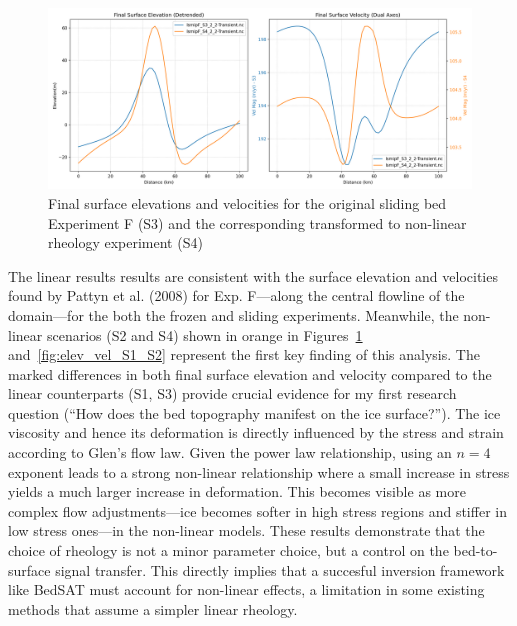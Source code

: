 \begin{figure}[H]
    \includegraphics[scale=0.40]{figures/combined_elevation_detrended_surface_velocity_['S3']_['S4'].png}
    \caption{Final surface elevations and velocities for the original sliding bed Experiment F (S3) and the corresponding transformed to non-linear rheology experiment (S4)}
    \label{fig:elev_vel_S3_S4}
\end{figure}
The linear results results are consistent with the surface elevation and velocities found by Pattyn et al. (2008) for Exp. F—along the central flowline of the domain—for the both the frozen and sliding experiments. Meanwhile, the non-linear scenarios (S2 and S4) shown in orange in Figures~\ref{fig:elev_vel_S3_S4} and~\ref{fig:elev_vel_S1_S2} represent the first key finding of this analysis. The marked differences in both final surface elevation and velocity compared to the linear counterparts (S1, S3) provide crucial evidence for my first research question (``How does the bed topography manifest on the ice surface?''). The ice viscosity and hence its deformation is directly influenced by the stress and strain according to Glen's flow law. Given the power law relationship, using an $n = 4$ exponent leads to a strong non-linear relationship where a small increase in stress yields a much larger increase in deformation. This becomes visible as more complex flow adjustments—ice becomes softer in high stress regions and stiffer in low stress ones—in the non-linear models. These results demonstrate that the choice of rheology is not a minor parameter choice, but a control on the bed-to-surface signal transfer. This directly implies that a succesful inversion framework like BedSAT must account for non-linear effects, a limitation in some existing methods that assume a simpler linear rheology.
